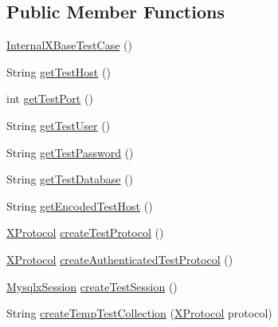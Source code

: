 \subsection*{Public Member Functions}
\begin{DoxyCompactItemize}
\item 
\mbox{\hyperlink{classtestsuite_1_1x_1_1internal_1_1_internal_x_base_test_case_a03640fcf01b579af5b4008d92e18af13}{Internal\+X\+Base\+Test\+Case}} ()
\item 
String \mbox{\hyperlink{classtestsuite_1_1x_1_1internal_1_1_internal_x_base_test_case_a13457e2cff28830fc8d52b3ac75fcce4}{get\+Test\+Host}} ()
\item 
int \mbox{\hyperlink{classtestsuite_1_1x_1_1internal_1_1_internal_x_base_test_case_adbb6830657d62ac7e002c95add62c970}{get\+Test\+Port}} ()
\item 
String \mbox{\hyperlink{classtestsuite_1_1x_1_1internal_1_1_internal_x_base_test_case_a6ba18ad1e76a998f6710ba527e034f9b}{get\+Test\+User}} ()
\item 
String \mbox{\hyperlink{classtestsuite_1_1x_1_1internal_1_1_internal_x_base_test_case_ab03190f086338cc7dc312bc5c995d4ff}{get\+Test\+Password}} ()
\item 
String \mbox{\hyperlink{classtestsuite_1_1x_1_1internal_1_1_internal_x_base_test_case_a4109ded28b889fa1dde36c7b372c3cee}{get\+Test\+Database}} ()
\item 
String \mbox{\hyperlink{classtestsuite_1_1x_1_1internal_1_1_internal_x_base_test_case_a5591160243bc7d8f720f383bcffbc769}{get\+Encoded\+Test\+Host}} ()
\item 
\mbox{\hyperlink{classcom_1_1mysql_1_1cj_1_1protocol_1_1x_1_1_x_protocol}{X\+Protocol}} \mbox{\hyperlink{classtestsuite_1_1x_1_1internal_1_1_internal_x_base_test_case_a382792b903d84f33a15e3f69cbc3df10}{create\+Test\+Protocol}} ()
\item 
\mbox{\hyperlink{classcom_1_1mysql_1_1cj_1_1protocol_1_1x_1_1_x_protocol}{X\+Protocol}} \mbox{\hyperlink{classtestsuite_1_1x_1_1internal_1_1_internal_x_base_test_case_a59f0fb416e74b3c4e8f27caa90498fd0}{create\+Authenticated\+Test\+Protocol}} ()
\item 
\mbox{\hyperlink{classcom_1_1mysql_1_1cj_1_1_mysqlx_session}{Mysqlx\+Session}} \mbox{\hyperlink{classtestsuite_1_1x_1_1internal_1_1_internal_x_base_test_case_a301d976a3cdb46f5072dc0a12d10d205}{create\+Test\+Session}} ()
\item 
String \mbox{\hyperlink{classtestsuite_1_1x_1_1internal_1_1_internal_x_base_test_case_a4cb907ae189f6df0d2bc07441c53a8fd}{create\+Temp\+Test\+Collection}} (\mbox{\hyperlink{classcom_1_1mysql_1_1cj_1_1protocol_1_1x_1_1_x_protocol}{X\+Protocol}} protocol)
\end{DoxyCompactItemize}
